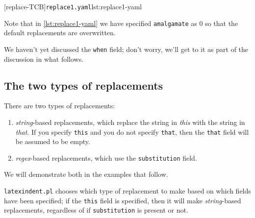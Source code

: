 	\begin{cmhtcbraster}[raster column skip=.01\linewidth]
		[replace-TCB]{\texttt{replace1.yaml}}{lst:replace1-yaml}
	\end{cmhtcbraster}

	Note that in \cref{lst:replace1-yaml} we have specified \texttt{amalgamate} as 0 so that
	the default replacements are overwritten.

	We haven't yet discussed the \texttt{when} field; don't worry, we'll get to it as part of
	the discussion in what follows.

\subsection{The two types of replacements}
	There are two types of replacements:
	\begin{enumerate}
		\item \emph{string}-based replacements, which replace the string in
		      \emph{this} with the string in \emph{that}.
		      If you specify \texttt{this} and you do not specify \texttt{that}, then the \texttt{that}
		      field will be assumed to be empty.
		\item \emph{regex}-based replacements, which use the \texttt{substitution} field.
	\end{enumerate}
	We will demonstrate both in the examples that follow.

	\texttt{latexindent.pl} chooses which type of replacement to make based on which fields
	have been specified; if the \texttt{this} field is specified, then it will make
	\emph{string}-based replacements, regardless of if \texttt{substitution} is present or
	not.

